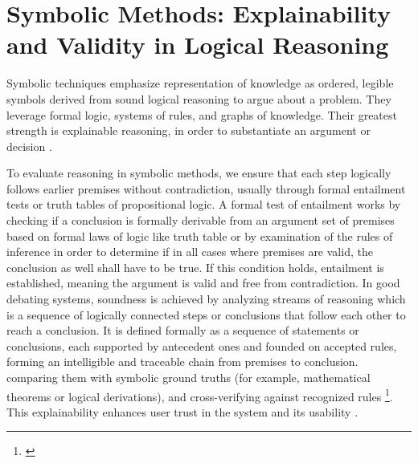 \documentclass[conference]{IEEEtran}
\begin{document}
\section{Symbolic Methods: Explainability and Validity in Logical Reasoning}
Symbolic techniques emphasize representation of knowledge as ordered, legible symbols derived from sound logical reasoning to argue about a problem. They leverage formal logic, systems of rules, and graphs of knowledge. Their greatest strength is explainable reasoning, in order to substantiate an argument or decision \cite{kasif2024trilogy}. 

To evaluate reasoning in symbolic methods, we ensure that each step logically follows earlier premises without contradiction, usually through formal entailment tests or truth tables of propositional logic. A formal test of entailment works by checking if a conclusion is formally derivable from an argument set of premises based on formal laws of logic like truth table or by examination of the rules of inference in order to determine if in all cases where premises are valid, the conclusion as well shall have to be true. If this condition holds, entailment is established, meaning the argument is valid and free from contradiction. In good debating systems, soundness is achieved by analyzing streams of reasoning which is a sequence of logically connected steps or conclusions that follow each other to reach a conclusion. It is defined formally as a sequence of statements or conclusions, each supported by antecedent ones and founded on accepted rules, forming an intelligible and traceable chain from premises to conclusion. comparing them with symbolic ground truths (for example, mathematical theorems or logical derivations), and cross-verifying against recognized rules \footnote{\label{leereasoning}\leereasoning}. This explainability enhances user trust in the system and its usability \cite{kasif2024trilogy}.
\end{document}
